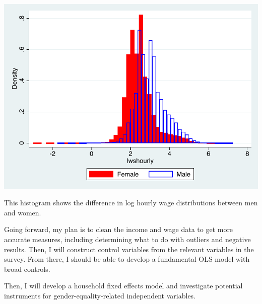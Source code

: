 \documentclass[a4paper]{article}
\begin{document}
\begin{stlog}\end{stlog}
\begin{center}
    \includegraphics[width=.6\textwidth]{ps5_5.pdf}
\end{center}
This histogram shows the difference in log hourly wage distributions between men and women.

Going forward, my plan is to clean the income and wage data to get more accurate measures, including determining what to do with outliers and negative results. Then, I will construct control variables from the relevant variables in the survey. From there, I should be able to develop a fundamental OLS model with broad controls.

Then, I will develop a household fixed effects model and investigate potential instruments for gender-equality-related independent variables.
\end{document}
